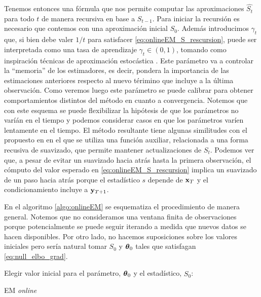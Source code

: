 Tenemos entonces una fórmula que nos permite computar las aproximaciones $\widehat{S_t}$ para todo $t$ de manera recursiva en base a $S_{t-1}$. Para iniciar la recursión es necesario que contemos con una aproximación inicial $S_0$. Además introducimos $\gamma_t$ que, si bien debe valer $1/t$ para satisfacer \ref{eq:onlineEM_S_rescursion}, puede ser interpretada como una tasa de aprendizaje $\gamma_t \in (0, 1)$, tomando como inspiración técnicas de aproximación estocástica \cite{Legland1997}. Este parámetro va a controlar la ``memoria'' de los estimadores, es decir, pondera la importancia de las estimaciones anteriores respecto al nuevo térimino que incluye a la última observación. Como veremos luego este parámetro se puede calibrar para obtener comportamientos distintos del método en cuanto a convergencia. Notemos que con este esquema se puede flexibilizar la hipótesis de que los parámetros no varíán en el tiempo y podemos considerar casos en que los parámetros varíen lentamente en el tiempo. El método resultante tiene algunas similitudes con el propuesto en \cite{Cappe2009} en el que se utiliza una función auxiliar, relacionada a una forma recusiva de suavizado, que permite mantener actualizaciones de $S_t$. Podemos ver que, a pesar de evitar un suavizado hacia atrás hasta la primera observación, el cómputo del valor esperado en \ref{eq:onlineEM_S_rescursion} implica un suavizado de un paso hacia atrás porque el estadístico $s$ depende de $\mathbf{x}_T$ y el condicionamiento incluye a $\mathbf{y}_{T+1}$. 

En el algoritmo \ref{algo:onlineEM} se esquematiza el procedimiento de manera general. Notemos que no consideramos una ventana finita de observaciones porque potencialmente se puede seguir iterando a medida que nuevos datos se hacen disponibles. Por otro lado, no hacemos suposiciones sobre los valores iniciales pero sería natural tomar $S_0$ y $\mbox{\boldmath$ \theta $}_0$ tales que satisfagan \ref{eq:null_elbo_grad}.

\begin{algorithm}[H]\label{algo:onlineEM}
    Elegir valor inicial para el parámetro, $\mbox{\boldmath$ \theta $}_0$ y el estadístico, $\widehat{S_0}$: \\
        \caption{EM \textit{online}}
\end{algorithm}


